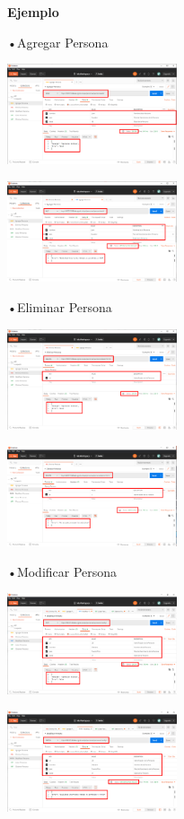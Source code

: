 \documentclass[twoside,twocolumn]{article}
\begin{document}
\textbf{Ejemplo}


•Agregar Persona
\begin{center}
	\includegraphics[width=5cm]{./img/3.png} 
\end{center}
 
\begin{center}
	\includegraphics[width=5cm]{./img/4.png} 
\end{center}
 
•Eliminar Persona
\begin{center}
	\includegraphics[width=5cm]{./img/5.png} 
\end{center}
\begin{center}
	\includegraphics[width=5cm]{./img/6.png} 
\end{center}
 
 

•Modificar Persona
\begin{center}
	\includegraphics[width=5cm]{./img/7.png} 
\end{center}
\begin{center}
	\includegraphics[width=5cm]{./img/8.png} 
\end{center}
 
\end{document}

